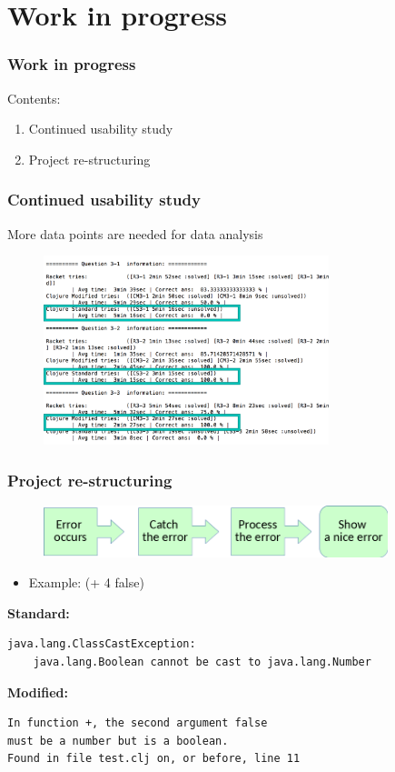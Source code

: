 \documentclass{beamer}
\begin{document}
\section{Work in progress}

\begin{frame}
  \frametitle{Work in progress}
Contents:
\begin{enumerate}
\item Continued usability study 
\item Project re-structuring
\end{enumerate}
\end{frame}

\begin{frame}
  \frametitle{Continued usability study }
More data points are needed for data analysis
\begin{figure}
\includegraphics[height=55mm]{one-data.png}
\end{figure}
\end{frame}


\begin{frame}[fragile]
  \frametitle{Project re-structuring}


\begin{figure}
\includegraphics[height=15mm]{Step.png}
\end{figure}
\begin{itemize}
\item Example: (+ 4 false)
\end{itemize}
\textbf{Standard:} 
\begin{verbatim}
java.lang.ClassCastException: 
	java.lang.Boolean cannot be cast to java.lang.Number
\end{verbatim}
\textbf{Modified:}
\begin{verbatim}
In function +, the second argument false 
must be a number but is a boolean.
Found in file test.clj on, or before, line 11
\end{verbatim}
\end{frame}
\end{document}
